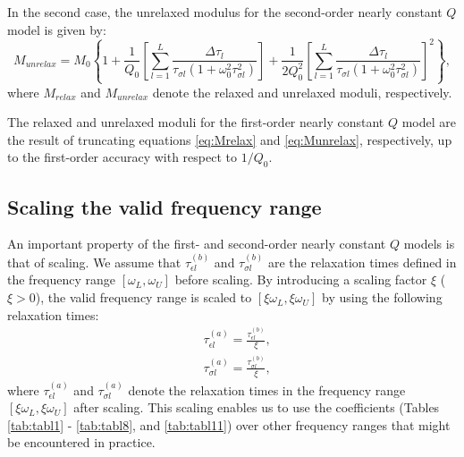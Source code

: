 \documentclass[article]{./macros/elsarticle_qh}
\begin{document}
In the second case, the unrelaxed modulus for the second-order nearly constant $Q$ model is given by:
\begin{equation} \label{eq:Munrelax}
M_{unrelax} = M_{0} \left\{ 1 + 
\frac{1}{Q_{0}}
\left[ \sum_{l=1}^{L} \frac{\Delta \tau_{l}}
{\tau_{\sigma l}(1 + \omega_{0}^2 \tau_{\sigma l}^2)}
\right]
+ \frac{1}{2Q_{0}^2}
\left[ \sum_{l=1}^{L} \frac{\Delta \tau_{l}}
{\tau_{\sigma l}(1 + \omega_{0}^2 \tau_{\sigma l}^2)}
\right]^2 
\right \} ,
\end{equation}
where $M_{relax}$ and $M_{unrelax}$ denote the relaxed and unrelaxed moduli, respectively. 

The relaxed and unrelaxed moduli for the first-order nearly constant $Q$ model are the result of truncating equations \ref{eq:Mrelax} and \ref{eq:Munrelax}, respectively, up to the first-order accuracy with respect to $1/Q_{0}$.

\subsection{Scaling the valid frequency range}
An important property of the first- and second-order nearly constant $Q$ models is that of scaling. We assume that $\tau_{\epsilon l}^{(b)}$ and $\tau_{\sigma l}^{(b)}$ are the relaxation times defined in the frequency range $[\omega_{L}, \omega_{U}]$ before scaling. By introducing a scaling factor $\xi$ ($\xi>0$), the valid frequency range is scaled to $[\xi \omega_{L}, \xi \omega_{U}]$ by using the following relaxation times:
\begin{equation} \label{eq:tau_scale}
\begin{split}
& \tau_{\epsilon l}^{(a)} = \frac{\tau_{\epsilon l}^{(b)}}{\xi} , \\ 
& \tau_{\sigma l}^{(a)} = \frac{\tau_{\sigma l}^{(b)}}{\xi}   ,
\end{split}
\end{equation}
where $\tau_{\epsilon l}^{(a)}$ and $\tau_{\sigma l}^{(a)}$ denote the relaxation times in the frequency range $[\xi \omega_{L}, \xi \omega_{U}]$ after scaling. This scaling enables us to use the coefficients (Tables \ref{tab:tabl1} - \ref{tab:tabl8}, and \ref{tab:tabl11}) over other frequency ranges that might be encountered in practice.
\end{document}
